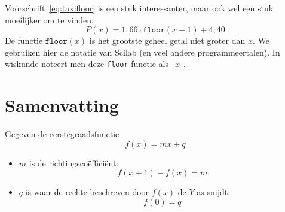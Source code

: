 Voorschrift~\eqref{eq:taxifloor} is een stuk interessanter, maar ook wel een stuk moeilijker om te vinden.
\begin{equation}\label{eq:taxifloor}
P(x)= 1,66\cdot \mathtt{floor}(x+1)+4,40
\end{equation}
De functie $\mathtt{floor}(x)$ is het grootste geheel getal niet groter dan $x$. We gebruiken hier de notatie van Scilab (en veel andere programmeertalen). In wiskunde noteert men deze \verb+floor+-functie als $\lfloor x \rfloor$.

\section{Samenvatting}
\begin{center}
\end{center}
Gegeven de eerstegraadsfunctie
\[
  f(x) = mx+q
\]
\begin{itemize}
  \item $m$ is de richtingsco\"effici\"ent:
        \[
          f(x+1) - f(x) = m
        \]
  \item $q$ is waar de rechte beschreven door $f(x)$ de $Y$-as snijdt:
        \[
          f(0) = q
        \]
\end{itemize}



